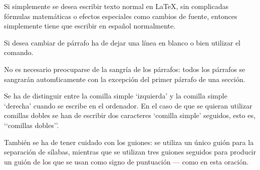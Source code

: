 \documentclass[a4paper,10pt]{letter}
\begin{document}
 
Si simplemente se desea escribir texto normal en LaTeX,
sin complicadas f\'ormulas matem\'aticas o efectos especiales
como cambios de fuente, entonces simplemente tiene que escribir
en espa\~nol normalmente.

Si desea cambiar de p\'arrafo ha de dejar una l\'inea en blanco o bien
utilizar el comando.\par

No es necesario preocuparse de la sangr\'ia de los p\'arrafos:
todos los p\'arrafos se sangrarán autom\'ticamente con la excepci\'on
del primer párrafo de una secci\'on.

Se ha de distinguir entre la comilla simple ‘izquierda’
y la comilla simple ‘derecha’ cuando se escribe en el ordenador.
En el caso de que se quieran utilizar comillas dobles se han de
escribir dos caracteres ‘comilla simple’ seguidos, esto es,
‘‘comillas dobles’’.\par

Tambi\'en se ha de tener cuidado con los guiones: se utiliza un \'unico
gui\'on para la separación de s\'ilabas, mientras que se utilizan
tres guiones seguidos para producir un guión de los que se usan
como signo de puntuaci\'on --- como en esta oración.
\end{document}

